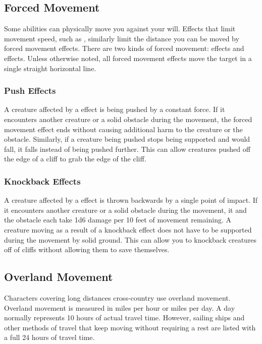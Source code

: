     \subsection{Forced Movement}\label{Forced Movement}
        Some abilities can physically move you against your will.
        Effects that limit movement speed, such as , similarly limit the distance you can be moved by forced movement effects.
        There are two kinds of forced movement:  effects and  effects.
        Unless otherwise noted, all forced movement effects move the target in a single straight horizontal line.

        \subsubsection{Push Effects}\label{Push Effects}
            A creature affected by a  effect is being pushed by a constant force.
            If it encounters another creature or a solid obstacle during the movement, the forced movement effect ends without causing additional harm to the creature or the obstacle.
            Similarly, if a creature being pushed stops being supported and would fall, it falls instead of being pushed further.
            This can allow creatures pushed off the edge of a cliff to grab the edge of the cliff.

        \subsubsection{Knockback Effects}\label{Knockback Effects}
            A creature affected by a  effect is thrown backwards by a single point of impact.
            If it encounters another creature or a solid obstacle during the movement, it and the obstacle each take 1d6 damage per 10 feet of movement remaining.
            A creature moving as a result of a knockback effect does not have to be supported during the movement by solid ground.
            This can allow you to knockback creatures off of cliffs without allowing them to save themselves.

    \subsection{Overland Movement}\label{Overland Movement}

        Characters covering long distances cross-country use overland movement.
        Overland movement is measured in miles per hour or miles per day.
        A day normally represents 10 hours of actual travel time.
        However, sailing ships and other methods of travel that keep moving without requiring a rest are listed with a full 24 hours of travel time.

